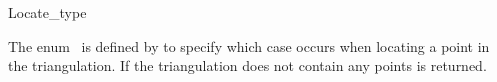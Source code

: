 
\ccModifierCrossRefOff
\begin{ccRefEnum}{Locate_type}

\ccDefinition
  
The enum \ccRefName\ is defined by  to
specify which case occurs when locating a point in the
triangulation. If the triangulation does not contain any points
 is returned.

{}

\ccSeeAlso


\end{ccRefEnum}
\ccModifierCrossRefOn
